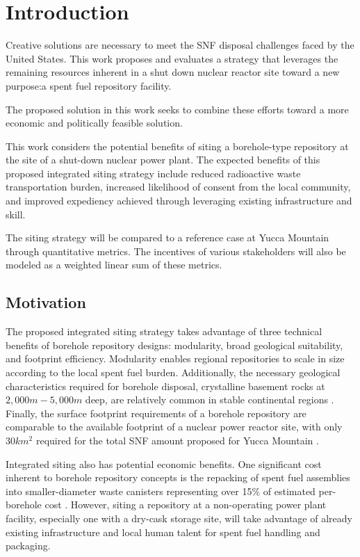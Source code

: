 
\section{Introduction}
Creative solutions are necessary to meet the \gls{SNF} disposal challenges 
faced by the United States.
This work proposes and evaluates a strategy that leverages the 
remaining resources inherent in a shut down nuclear reactor site toward a new 
purpose:a spent fuel repository facility.

The proposed solution in this 
work seeks to combine these efforts toward a more economic and politically 
feasible solution. 

This work considers the potential benefits of siting a borehole-type repository 
at the site of a shut-down nuclear power plant.  The  expected benefits of this 
proposed integrated siting strategy include reduced radioactive waste 
transportation burden, increased likelihood of consent from the local 
community, and improved expediency achieved through leveraging existing 
infrastructure and skill.

The siting strategy will be compared to a reference case at 
Yucca Mountain through quantitative metrics. The incentives of various 
stakeholders will also be modeled as a weighted linear sum of these 
metrics. 

\subsection{Motivation}
The proposed integrated siting strategy takes advantage of three technical 
benefits of borehole repository designs: modularity, broad geological 
suitability, and footprint efficiency. Modularity enables regional repositories 
to scale in size according to the local spent fuel burden. 
Additionally, the necessary geological characteristics required for borehole 
disposal, crystalline basement rocks at $2,000 m - 5,000 m$ deep, are relatively 
common in stable continental regions \cite{arnold_research_2012}. Finally, the 
surface footprint requirements of a borehole repository are comparable to the 
available footprint of a nuclear power reactor site, with only $30 km^2$ 
required for the total \gls{SNF} amount proposed for Yucca Mountain 
\cite{brady_deep_2009}.

Integrated siting also has potential economic benefits. One significant cost 
inherent to borehole repository concepts is the repacking of spent fuel 
assemblies into smaller-diameter waste canisters representing over 15\% of 
estimated per-borehole cost \cite{arnold_reference_2011}.  However, siting a 
repository at a non-operating power plant facility, especially one with a 
dry-cask storage site, will take advantage of already existing infrastructure 
and local human talent for spent fuel handling and packaging. 


